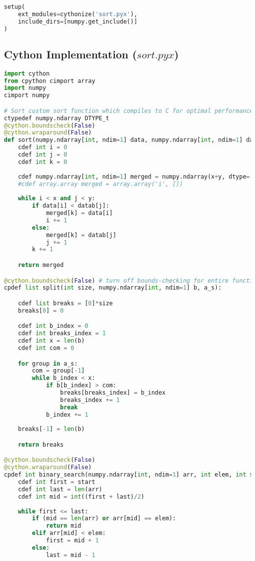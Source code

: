 \documentclass[12pt]{article}
\begin{document}
{\begin{lstlisting}[language={Python}]
setup(
    ext_modules=cythonize('sort.pyx'),
    include_dirs=[numpy.get_include()]
)
    \end{lstlisting}
    \subsection{Cython Implementation ($sort.pyx$)}
    \begin{lstlisting}[language={Python}]
import cython
from cpython cimport array
import numpy 
cimport numpy

# Sort custom sort function which compiles to C for optimal performance 
ctypedef numpy.ndarray DTYPE_t
@cython.boundscheck(False)
@cython.wraparound(False)
def sort(numpy.ndarray[int, ndim=1] data, numpy.ndarray[int, ndim=1] datab, int x, int y):
    cdef int i = 0
    cdef int j = 0
    cdef int k = 0
    
    cdef numpy.ndarray[int, ndim=1] merged = numpy.ndarray(x+y, dtype='i')
    #cdef array.array merged = array.array('i', [])
    
    while i < x and j < y:
        if data[i] < datab[j]:
            merged[k] = data[i]
            i += 1
        else:
            merged[k] = datab[j]
            j += 1
        k += 1

    return merged

@cython.boundscheck(False) # turn off bounds-checking for entire function
cpdef list split(int size, numpy.ndarray[int, ndim=1] b, a_s):

    cdef list breaks = [0]*size 
    breaks[0] = 0

    cdef int b_index = 0 
    cdef int breaks_index = 1
    cdef int x = len(b)
    cdef int com = 0

    for group in a_s:
        com = group[-1]
        while b_index < x:
            if b[b_index] > com:
                breaks[breaks_index] = b_index
                breaks_index += 1
                break
            b_index += 1
    
    breaks[-1] = len(b)

    return breaks

@cython.boundscheck(False)
@cython.wraparound(False)
cpdef int binary_search(numpy.ndarray[int, ndim=1] arr, int elem, int start):
    cdef int first = start
    cdef int last = len(arr)
    cdef int mid = int((first + last)/2)
    
    while first <= last:
        if (mid == len(arr) or arr[mid] == elem):
            return mid
        elif arr[mid] < elem:
            first = mid + 1
        else:
            last = mid - 1


\end{lstlisting}}
\end{document}
